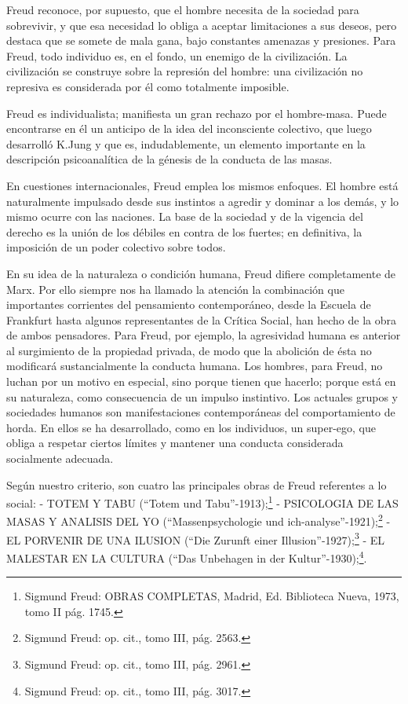 \documentclass[
]{book}
\begin{document}
Freud reconoce, por supuesto, que el hombre necesita de la sociedad para sobrevivir, y que esa necesidad lo obliga a aceptar limitaciones a sus deseos, pero destaca que se somete de mala gana, bajo constantes amenazas y presiones. Para Freud, todo individuo es, en el fondo, un enemigo de la civilización. La civilización se construye sobre la represión del hombre: una civilización no represiva es considerada por él como totalmente imposible.

Freud es individualista; manifiesta un gran rechazo por el hombre-masa. Puede encontrarse en él un anticipo de la idea del inconsciente colectivo, que luego desarrolló K.Jung y que es, indudablemente, un elemento importante en la descripción psicoanalítica de la génesis de la conducta de las masas.

En cuestiones internacionales, Freud emplea los mismos enfoques. El hombre está naturalmente impulsado desde sus instintos a agredir y dominar a los demás, y lo mismo ocurre con las naciones. La base de la sociedad y de la vigencia del derecho es la unión de los débiles en contra de los fuertes; en definitiva, la imposición de un poder colectivo sobre todos.

En su idea de la naturaleza o condición humana, Freud difiere completamente de Marx. Por ello siempre nos ha llamado la atención la combinación que importantes corrientes del pensamiento contemporáneo, desde la Escuela de Frankfurt hasta algunos representantes de la Crítica Social, han hecho de la obra de ambos pensadores. Para Freud, por ejemplo, la agresividad humana es anterior al surgimiento de la propiedad privada, de modo que la abolición de ésta no modificará sustancialmente la conducta humana. Los hombres, para Freud, no luchan por un motivo en especial, sino porque tienen que hacerlo; porque está en su naturaleza, como consecuencia de un impulso instintivo. Los actuales grupos y sociedades humanos son manifestaciones contemporáneas del comportamiento de horda. En ellos se ha desarrollado, como en los individuos, un super-ego, que obliga a respetar ciertos límites y mantener una conducta considerada socialmente adecuada.

Según nuestro criterio, son cuatro las principales obras de Freud referentes a lo social: - TOTEM Y TABU (``Totem und Tabu''-1913);\footnote{Sigmund Freud: OBRAS COMPLETAS, Madrid, Ed. Biblioteca Nueva, 1973, tomo II pág. 1745.} - PSICOLOGIA DE LAS MASAS Y ANALISIS DEL YO (``Massenpsychologie und ich-analyse''-1921);\footnote{Sigmund Freud: op. cit., tomo III, pág. 2563.} - EL PORVENIR DE UNA ILUSION (``Die Zurunft einer Illusion''-1927);\footnote{Sigmund Freud: op. cit., tomo III, pág. 2961.} - EL MALESTAR EN LA CULTURA (``Das Unbehagen in der Kultur''-1930);\footnote{ Sigmund Freud: op. cit., tomo III, pág. 3017.}.
\end{document}
